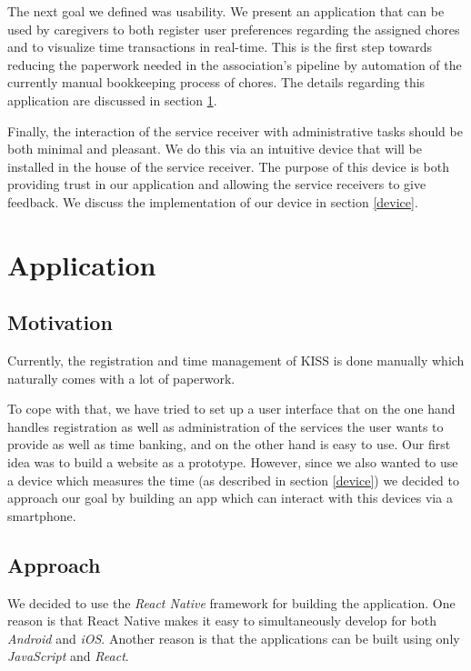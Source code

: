 \documentclass[12pt]{report}
\begin{document}
The next goal we defined was usability. We present an application that can be used by caregivers to both register user preferences regarding the assigned chores and to visualize time transactions in real-time. This is the first step towards reducing the paperwork needed in the association's pipeline by automation of the currently manual bookkeeping process of chores. The details regarding this application are discussed in section \ref{app}.

Finally, the interaction of the service receiver with administrative tasks should be both minimal and pleasant. We do this via an intuitive device that will be installed in the house of the service receiver. The purpose of this device is both providing trust in our application and allowing the service receivers to give feedback. We discuss the implementation of our device in section \ref{device}.


\section{Application}\label{app}

\subsection{Motivation}
Currently, the registration and time management of KISS is done manually which naturally comes with a lot of paperwork.

To cope with that, we have tried to set up a user interface that on the one hand handles registration as well as administration of the services the user wants to provide as well as time banking, and on the other hand is easy to use. Our first idea was to build a website as a prototype. However, since we also wanted to use a device which measures the time (as described in section \ref{device}) we decided to approach our goal by building an app which can interact with this devices via a smartphone.

\subsection{Approach}
We decided to use the \emph{React Native} framework for building the application. One reason is that React Native makes it easy to simultaneously develop for both \emph{Android} and \emph{iOS}. Another reason is that the applications can be built using only \emph{JavaScript} and \emph{React}.

\end{document}
